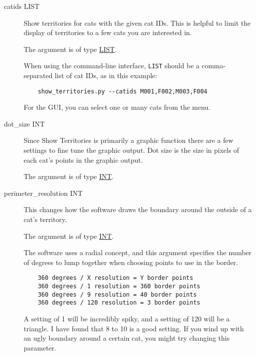 \begin{description}

\item[catids LIST]
\hypertarget{territory-catids}{}

Show territories for cats with the given cat IDs. This is helpful to
limit the display of territories to a few cats you are interested in.

The argument is of type \hyperlink{argument-type-int}{LIST}.

When using the command-line interface, \verb=LIST= should be a
comma-separated list of cat IDs, as in this example:

\begin{verbatim}
    show_territories.py --catids M001,F002,M003,F004
\end{verbatim}

For the GUI, you can select one or many cats from the menu.

\item[dot\_size INT]
\hypertarget{territory-dot-size}{}

Since Show Territories is primarily a graphic function there are a few
settings to fine tune the graphic output. Dot size is the size in
pixels of each cat's points in the graphic output.

The argument is of type \hyperlink{argument-type-int}{INT}.

\item[perimeter\_resolution INT]
\hypertarget{territory-perimeter-resolution}{}

This changes how the software draws the boundary around the outside of
a cat's territory.

The argument is of type \hyperlink{argument-type-int}{INT}.

The software uses a radial concept, and this argument specifies the
number of degrees to lump together when choosing points to use in the
border.

\begin{verbatim}
    360 degrees / X resolution = Y border points
    360 degrees / 1 resolution = 360 border points
    360 degrees / 9 resolution = 40 border points
    360 degrees / 120 resolution = 3 border points
\end{verbatim}

A setting of 1 will be incredibly spiky, and a setting of 120 will be
a triangle. I have found that 8 to 10 is a good setting. If you wind
up with an ugly boundary around a certain cat, you might try changing
this parameter.


\end{description}

